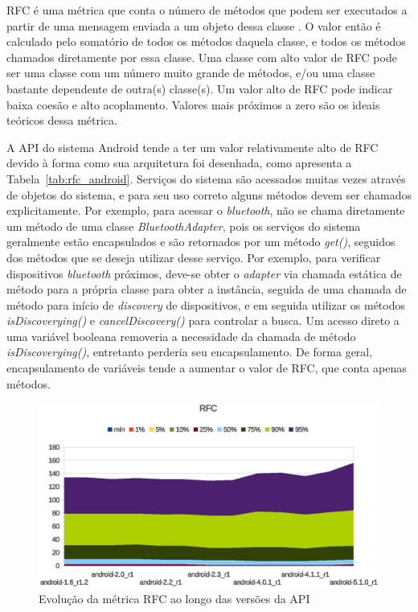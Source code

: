 RFC é uma métrica que conta o número de métodos que podem ser executados a partir de uma mensagem enviada a um objeto dessa classe \cite{chidamberkemerer}. O valor então é calculado pelo somatório de todos os métodos daquela classe, e todos os métodos chamados diretamente por essa classe. Uma classe com alto valor de RFC pode ser uma classe com um número muito grande de métodos, e/ou uma classe bastante dependente de outra(s) classe(s). Um valor alto de RFC pode indicar baixa coesão e alto acoplamento. Valores mais próximos a zero são os ideais teóricos dessa métrica.

A API do sistema Android tende a ter um valor relativamente alto de RFC devido à forma como sua arquitetura foi desenhada, como apresenta a Tabela~\ref{tab:rfc_android}. Serviços do sistema são acessados muitas vezes através de objetos do sistema, e para seu uso correto alguns métodos devem ser chamados explicitamente. Por exemplo, para acessar o \textit{bluetooth}, não se chama diretamente um método de uma classe \textit{BluetoothAdapter}, pois os serviços do sistema geralmente estão encapsulados e são retornados por um método \textit{get()}, seguidos dos métodos que se deseja utilizar desse serviço. Por exemplo, para verificar dispositivos \textit{bluetooth} próximos, deve-se obter o \textit{adapter} via chamada estática de método para a própria classe para obter a instância, seguida de uma chamada de método para início de \textit{discovery} de dispositivos, e em seguida utilizar os métodos \textit{isDiscoverying()} e \textit{cancelDiscovery()} para controlar a busca. Um acesso direto a uma variável booleana removeria a necessidade da chamada de método \textit{isDiscoverying()}, entretanto perderia seu encapsulamento. De forma geral, encapsulamento de variáveis tende a aumentar o valor de RFC, que conta apenas métodos. 

\begin{figure}[!htb]
\centering
\includegraphics [keepaspectratio=true,scale=0.85]{figuras/graphs/rfc_android.eps}
\caption{Evolução da métrica RFC ao longo das versões da API}
\label{fig:rfc_android}
\end{figure}

